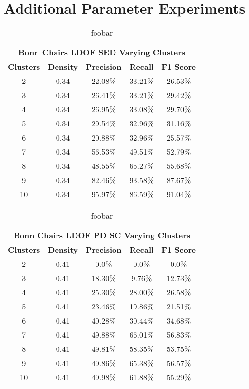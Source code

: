 \section{Additional Parameter Experiments}
\label{sec:appendix_varying_lambda}

\begin{table}[H]
\centering
\begin{tabular}{|c|c|c|c|c|}
\hline
\multicolumn{5}{|c|}{Bonn Chairs LDOF SED Varying Clusters}                        \\ \hline
\textbf{Clusters} & \textbf{Density} & \textbf{Precision} & \textbf{Recall} & \textbf{F1 Score} \\ \hline
2 & 0.34 & 22.08\%   & 33.21\%     & 26.53\%  \\ \hline
3 & 0.34 & 26.41\%   & 33.21\%     & 29.42\%  \\ \hline
4 & 0.34 & 26.95\%   & 33.08\%     & 29.70\%  \\ \hline
5 & 0.34 & 29.54\%   & 32.96\%     & 31.16\%  \\ \hline
6 & 0.34 & 20.88\%   & 32.96\%     & 25.57\%  \\ \hline
7 & 0.34 & 56.53\%   & 49.51\%     & 52.79\%  \\ \hline
8 & 0.34 & 48.55\%   & 65.27\%     & 55.68\%  \\ \hline
9 & 0.34 & 82.46\%   & 93.58\%     & 87.67\%  \\ \hline              
10 & 0.34 & 95.97\%   & 86.59\%     & 91.04\%  \\ \hline
\end{tabular}
\caption[Bonn Chairs SED Varying Clusters]{foobar}
\label{tab:bonn_chairs_ldof_sed_c_6_9_10_eval}
\end{table}

\begin{table}[H]
\centering
\begin{tabular}{|c|c|c|c|c|}
\hline
\multicolumn{5}{|c|}{Bonn Chairs LDOF PD SC Varying Clusters}                        \\ \hline
\textbf{Clusters} & \textbf{Density} & \textbf{Precision} & \textbf{Recall} & \textbf{F1 Score} \\ \hline
2 & 0.41 & 0.0\%   & 0.0\%     & 0.0\%  \\ \hline
3 & 0.41 & 18.30\%   & 9.76\%     & 12.73\%  \\ \hline
4 & 0.41 & 25.30\%   & 28.00\%     & 26.58\%  \\ \hline
5 & 0.41 & 23.46\%   & 19.86\%     & 21.51\%  \\ \hline
6 & 0.41 & 40.28\%   & 30.44\%     & 34.68\%  \\ \hline
7 & 0.41 & 49.88\%   & 66.01\%     & 56.83\%  \\ \hline
8 & 0.41 & 49.81\%   & 58.35\%     & 53.75\%  \\ \hline
9 & 0.41 & 49.86\%   & 65.38\%     & 56.57\%  \\ \hline              
10 & 0.41 & 49.98\%   & 61.88\%     & 55.29\%  \\ \hline
\end{tabular}
\caption[Bonn Chairs PD SC Varying Clusters]{foobar}
\label{tab:bonn_chairs_ldof_sed_c_6_9_10_eval_pd_sc}
\end{table}

